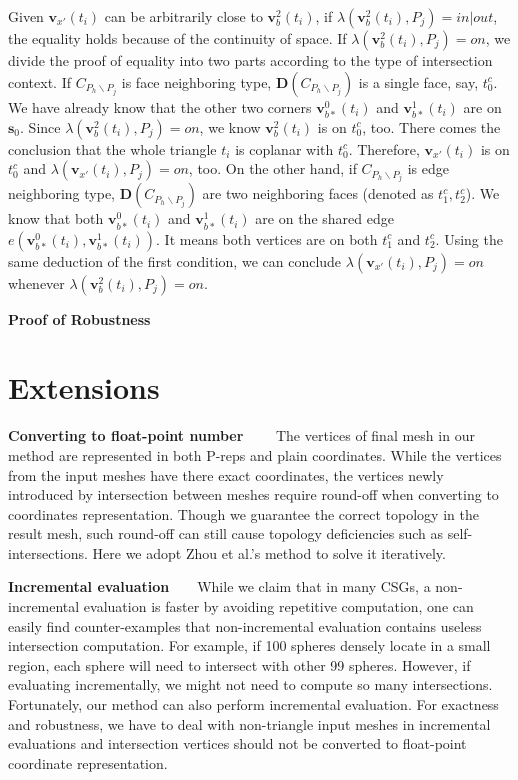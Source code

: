 \documentclass[10pt,journal,compsoc]{IEEEtran}
\begin{document}
Given $\bm{v}_{x'}(t_i)$ can be arbitrarily close to $\bm{v}_b^2(t_i)$, if $\lambda(\bm{v}_b^2(t_i), P_j) = in | out$, the equality holds because of the continuity of space. If $\lambda(\bm{v}_b^2(t_i), P_j) = on$, we divide the proof of equality into two parts according to the type of intersection context. If $C_{P_h \backslash P_j}$ is face neighboring type, $\boldsymbol{D}(C_{P_h \backslash P_j})$ is a single face, say, $t_0^c$. We have already know that the other two corners $\bm{v}_{b*}^{0}(t_i)$ and $\bm{v}_{b*}^{1}(t_i)$ are on $\bm{s}_0$. Since $\lambda(\bm{v}_b^2(t_i), P_j) = on$, we know $\bm{v}_b^2(t_i)$ is on $t_0^c$, too. There comes the conclusion that the whole triangle $t_i$ is coplanar with $t_0^c$. Therefore, $\bm{v}_{x'}(t_i)$ is on $t_0^c$ and $\lambda(\bm{v}_{x'}(t_i), P_j) = on$, too. On the other hand, if $C_{P_h \backslash P_j}$ is edge neighboring type, $\boldsymbol{D}(C_{P_h \backslash P_j})$ are two neighboring faces (denoted as $t_1^c, t_2^c$). We know that both $\bm{v}_{b*}^{0}(t_i)$ and $\bm{v}_{b*}^{1}(t_i)$ are on the shared edge $e(\bm{v}_{b*}^{0}(t_i), \bm{v}_{b*}^{1}(t_i))$. It means both vertices are on both $t_1^c$ and $t_2^c$. Using the same deduction of the first condition, we can conclude $\lambda(\bm{v}_{x'}(t_i), P_j) = on$ whenever $\lambda(\bm{v}_b^2(t_i), P_j) = on$.

\vspace{0.5em}
\noindent\textbf{Proof of Robustness}

\fi

\section{Extensions}

\vspace{0.5em}
\noindent\textbf{Converting to float-point number}~~~~
The vertices of final mesh in our method are represented in both P-reps and plain coordinates. While the vertices from the input meshes have there exact coordinates, the vertices newly introduced by intersection between meshes require round-off when converting to coordinates representation. Though we guarantee the correct topology in the result mesh, such round-off can still cause topology deficiencies such as self-intersections. Here we adopt Zhou et al.'s method \cite{zhou2016mesh} to solve it iteratively.

\vspace{0.5em}
\noindent\textbf{Incremental evaluation}~~~~While we claim that in many CSGs, a non-incremental evaluation is faster by avoiding repetitive computation, one can easily find counter-examples that non-incremental evaluation contains useless intersection computation. For example, if 100 spheres densely locate in a small region, each sphere will need to intersect with other 99 spheres. However, if evaluating incrementally, we might not need to compute so many intersections. Fortunately, our method can also perform incremental evaluation. For exactness and robustness, we have to deal with non-triangle input meshes in incremental evaluations and intersection vertices should not be converted to float-point coordinate representation.
\end{document}
